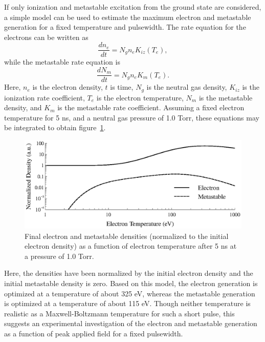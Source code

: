 If only ionization and metastable excitation from the ground state are
considered, a simple model can be used to estimate the maximum electron and
metastable generation for a fixed temperature and pulsewidth. The rate equation
for the electrons can be written as
\begin{equation}
  \frac{dn_e}{dt} = N_gn_eK_{iz}(T_e),
\end{equation}
while the metastable rate equation is
\begin{equation}
  \frac{dN_m}{dt} = N_gn_eK_{m}(T_e).
\end{equation}
Here, $n_e$ is the electron density, $t$ is time, $N_g$ is the neutral gas
density, $K_{iz}$ is the ionization rate coefficient, $T_e$ is the electron
temperature, $N_m$ is the metastable density, and $K_m$ is the metastable rate
coefficient. Assuming a fixed electron temperature for 5 ns, and a neutral gas
pressure of 1.0 Torr, these equations may be integrated to obtain
figure~\ref{fig:maxgen}.
\begin{figure}
  \centering
  \includegraphics{./chapters/modeling/figures/maxgen.eps}
  \caption{Final electron and metastable densities (normalized to the initial
    electron density) as a function of electron temperature after 5 ns at a 
    pressure of 1.0 Torr.}
  \label{fig:maxgen}
\end{figure}
Here, the densities have been normalized by the initial electron density and the
initial metastable density is zero. Based on this model, the electron generation
is optimized at a temperature of about 325 eV, whereas the metastable generation
is optimized at a temperature of about 115 eV. Though neither temperature is
realistic as a Maxwell-Boltzmann temperature for such a short pulse, this
suggests an experimental investigation of the electron and metastable generation
as a function of peak applied field for a fixed pulsewidth.

